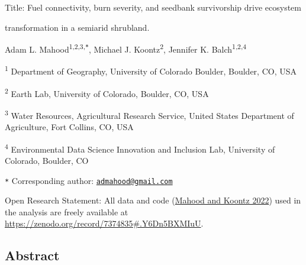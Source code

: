 \documentclass[
  12pt,
]{article}
\author{}
\date{\vspace{-2.5em}}
\begin{document}

Title: Fuel connectivity, burn severity, and seedbank survivorship drive
ecosystem

transformation in a semiarid shrubland.

Adam L. Mahood\textsuperscript{1,2,3,\texttt{*}}, Michael J.
Koontz\textsuperscript{2}, Jennifer K. Balch\textsuperscript{1,2,4}

\small

\textsuperscript{1} Department of Geography, University of Colorado
Boulder, Boulder, CO, USA

\textsuperscript{2} Earth Lab, University of Colorado, Boulder, CO, USA

\textsuperscript{3} Water Resources, Agricultural Research Service,
United States Department of Agriculture, Fort Collins, CO, USA

\textsuperscript{4} Environmental Data Science Innovation and Inclusion
Lab, University of Colorado, Boulder, CO

\texttt{*} Corresponding author:
\href{mailto:admahood@gmail.com}{\nolinkurl{admahood@gmail.com}}

\normalsize

Open Research Statement: All data and code
(\protect\hyperlink{ref-mahoodzenodo}{Mahood and Koontz 2022}) used in
the analysis are freely available at
\url{https://zenodo.org/record/7374835\#.Y6Dn5BXMIuU}.

\newpage

\linenumbers

\hypertarget{abstract}{%
\subsection{Abstract}\label{abstract}}
\end{document}

